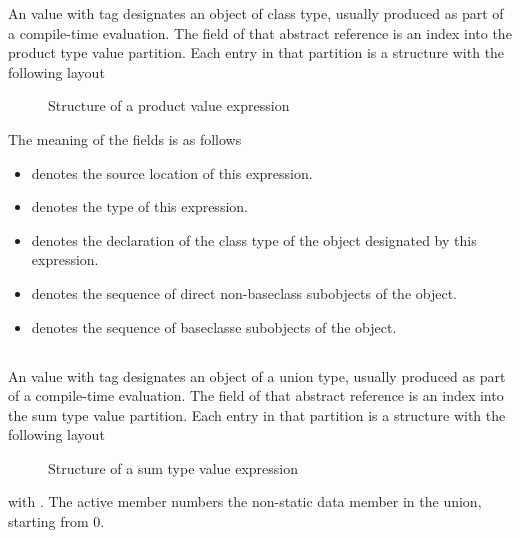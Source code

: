 An  value with tag  designates an object of class type, usually produced as part of a compile-time evaluation.
The  field of that abstract reference is an index into the product type value partition.  Each entry in that partition is a structure with the following layout
%
\begin{figure}[H]
	\centering
	\caption{Structure of a product value expression}
	\label{fig:ifc-product-value-structure}
\end{figure}
%
The meaning of the fields is as follows
\begin{itemize}
	\item {} denotes the source location of this expression.
	\item {} denotes the type of this expression.
	\item {} denotes the declaration of the class type of the object designated by this expression.
	\item {} denotes the sequence of direct non-baseclass subobjects of the object.
	\item {} denotes the sequence of baseclasse subobjects of the object.
\end{itemize}



\subsection{}
\label{sec:ifc:ExprSort:SumTypeValue}

An  value with tag  designates an object of a union type, usually produced as part of a compile-time evaluation.
The  field of that abstract reference is an index into the sum type value partition.  Each entry in that partition is a structure with the following layout
%
\begin{figure}[H]
	\centering
	\caption{Structure of a sum type value expression}
	\label{fig:ifc:ExprSort:SumTypeValue}
\end{figure}
%
with .  The active member numbers the non-static data member in the union, starting from $0$.

